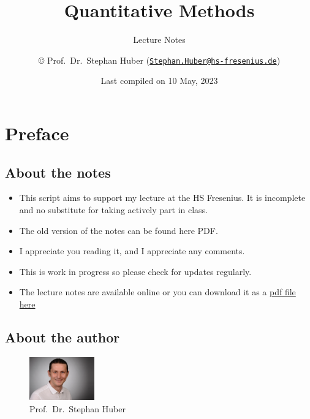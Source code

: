 \documentclass[
  12pt,
  oneside]{book}
\title{Quantitative Methods}
\subtitle{Lecture Notes}
\author{© Prof.~Dr.~Stephan Huber (\href{mailto:Stephan.Huber@hs-fresenius.de}{\nolinkurl{Stephan.Huber@hs-fresenius.de}})}
\date{Last compiled on 10 May, 2023}
\providecommand{\tightlist}{%
  \setlength{\itemsep}{0pt}\setlength{\parskip}{0pt}}
\theoremstyle{definition}
\theoremstyle{definition}
\theoremstyle{definition}
\theoremstyle{definition}
\theoremstyle{remark}
\begin{document}
\maketitle

{
\hypersetup{linkcolor=}
\setcounter{tocdepth}{2}
\tableofcontents
}
\hypertarget{preface}{%
\chapter*{Preface}\label{preface}}

\hypertarget{about-the-notes}{%
\section*{About the notes}\label{about-the-notes}}

\begin{itemize}
\tightlist
\item
  This script aims to support my lecture at the HS Fresenius. It is incomplete and no substitute for taking actively part in class.
\item
  The old version of the notes can be found here PDF.
\item
  I appreciate you reading it, and I appreciate any comments.
\item
  This is work in progress so please check for updates regularly.
\item
  The lecture notes are available online or you can download it as a \href{https://raw.githubusercontent.com/hubchev/hubchev.github.io/main/qm/_main.pdf}{pdf file here}
\end{itemize}

\hypertarget{about-the-author}{%
\section*{About the author}\label{about-the-author}}

\begin{figure}
\centering
\includegraphics[width=0.25\textwidth,height=\textheight]{fig/huber2.jpeg}
\caption[\label{fig:itsme} Prof.~Dr.~Stephan Huber]{\label{fig:itsme} Prof.~Dr.~Stephan Huber\footnotemark{}}
\end{figure}
\end{document}
